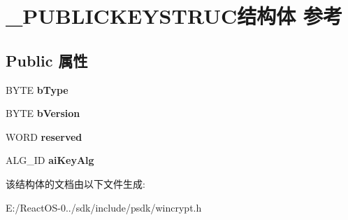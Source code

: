 \hypertarget{struct___p_u_b_l_i_c_k_e_y_s_t_r_u_c}{}\section{\+\_\+\+P\+U\+B\+L\+I\+C\+K\+E\+Y\+S\+T\+R\+U\+C结构体 参考}
\label{struct___p_u_b_l_i_c_k_e_y_s_t_r_u_c}
\subsection*{Public 属性}
\begin{DoxyCompactItemize}
\item 
\mbox{\label{struct___p_u_b_l_i_c_k_e_y_s_t_r_u_c_a70a4d364b4b1f2ce760579c7256b59ce}} 
B\+Y\+TE {\bfseries b\+Type}
\item 
\mbox{\label{struct___p_u_b_l_i_c_k_e_y_s_t_r_u_c_abbe92e15e00d371cf574ba4e6d4426dd}} 
B\+Y\+TE {\bfseries b\+Version}
\item 
\mbox{\label{struct___p_u_b_l_i_c_k_e_y_s_t_r_u_c_a1ee30b77eed42977d93bc6235799f009}} 
W\+O\+RD {\bfseries reserved}
\item 
\mbox{\label{struct___p_u_b_l_i_c_k_e_y_s_t_r_u_c_a3220ffa8267fff0ede6d1b6f6e614d50}} 
A\+L\+G\+\_\+\+ID {\bfseries ai\+Key\+Alg}
\end{DoxyCompactItemize}


该结构体的文档由以下文件生成\+:\begin{DoxyCompactItemize}
\item 
E\+:/\+React\+O\+S-\/0../sdk/include/psdk/wincrypt.\+h\end{DoxyCompactItemize}

